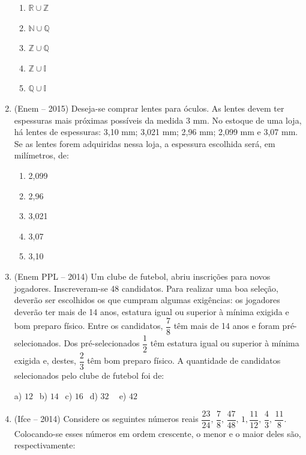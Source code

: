 \begin{multicols*}{2}
\begin{enumerate}
\begin{enumerate}
	\item $ \mathbb{R} \cup \mathbb{Z} $
	\item $ \mathbb{N} \cup \mathbb{Q} $
	\item $ \mathbb{Z} \cup \mathbb{Q} $
	\item $ \mathbb{Z} \cup \mathbb{I} $
	\item $ \mathbb{Q} \cup \mathbb{I} $

	\end{enumerate}

\item (Enem – 2015) Deseja-se comprar lentes para óculos. As lentes devem ter espessuras mais próximas possíveis da medida 3 mm. No estoque de uma loja, há lentes de espessuras: 3,10 mm; 3,021 mm; 2,96 mm; 2,099 mm e 3,07 mm. 
Se as lentes forem adquiridas nessa loja, a espessura escolhida será, em milímetros, de: 

	\begin{enumerate}		

	\item 2,099 
	\item 2,96 
	\item 3,021 
	\item 3,07 
	\item 3,10

	\end{enumerate}

\item (Enem PPL – 2014) Um clube de futebol, abriu inscrições para novos jogadores. Inscreveram-se 48 candidatos. Para realizar uma boa seleção, deverão ser escolhidos os que cumpram algumas exigências: os jogadores deverão ter mais de 14 anos, estatura igual ou superior à mínima exigida e bom preparo físico. Entre os candidatos, $\dfrac{7}{8}$ têm mais de 14 anos e foram pré-selecionados. Dos pré-selecionados $\dfrac{1}{2}$ têm estatura igual ou superior à mínima exigida e, destes, $\dfrac{2}{3}$ têm bom preparo físico. A quantidade de candidatos selecionados pelo clube de futebol foi de: 
	
	a) $12 \ \ $ b) $14 \ \ $ c) $16 \ \ $ d) $32 \ \ \ \ $ e) $42 \ \ $
	
\item (Ifce – 2014) Considere os seguintes números reais $\dfrac{23}{24},\, \dfrac{7}{8},\, \dfrac{47}{48},\, 1, \dfrac{11}{12},\, \dfrac{4}{3},\, \dfrac{11}{8} $. Colocando-se esses números em ordem crescente, o menor e o maior deles são, respectivamente: 
	
	\begin{enumerate}				
	

\end{enumerate}
\end{enumerate}
\end{multicols*}
